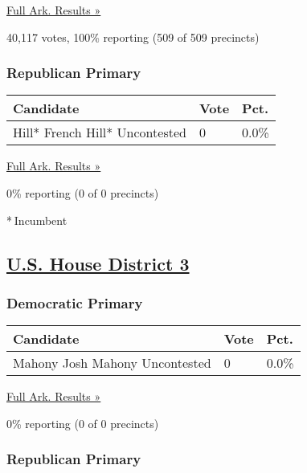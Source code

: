 \href{https://www.nytimes3xbfgragh.onion/elections/results/arkansas}{Full
Ark. Results »}

40,117 votes, 100\% reporting (509 of 509 precincts)

\hypertarget{republican-primary-2}{%
\subsubsection{Republican Primary}\label{republican-primary-2}}

\begin{longtable}[]{@{}lll@{}}
\toprule
Candidate & Vote & Pct.\tabularnewline
\midrule
\endhead
 Hill* French Hill* Uncontested & 0 & 0.0\%\tabularnewline
\bottomrule
\end{longtable}

\href{https://www.nytimes3xbfgragh.onion/elections/results/arkansas}{Full
Ark. Results »}

0\% reporting (0 of 0 precincts)

* Incumbent

\hypertarget{us-house-district-3}{%
\subsection{\texorpdfstring{\href{https://www.nytimes3xbfgragh.onion/elections/results/arkansas-house-district-3-primary-election}{U.S.
House District 3}}{U.S. House District 3}}\label{us-house-district-3}}

\hypertarget{democratic-primary-3}{%
\subsubsection{Democratic Primary}\label{democratic-primary-3}}

\begin{longtable}[]{@{}lll@{}}
\toprule
Candidate & Vote & Pct.\tabularnewline
\midrule
\endhead
 Mahony Josh Mahony Uncontested & 0 & 0.0\%\tabularnewline
\bottomrule
\end{longtable}

\href{https://www.nytimes3xbfgragh.onion/elections/results/arkansas}{Full
Ark. Results »}

0\% reporting (0 of 0 precincts)

\hypertarget{republican-primary-3}{%
\subsubsection{Republican Primary}\label{republican-primary-3}}

